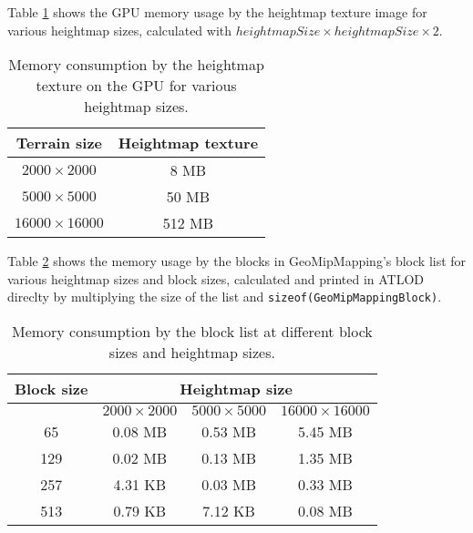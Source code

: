 Table \ref{tbl:memory-heightmap} shows the GPU memory usage by the heightmap texture image 
for various heightmap sizes, calculated with $heightmapSize \times heightmapSize \times 2$.

\begin{table}[H]
  \begin{center}
    \begin{tabular}{ c|c }
      Terrain size & Heightmap texture \\
      \hline
      $2000 \times 2000$ & 8 MB\\
      \hline
      $5000 \times 5000$ & 50 MB\\
      \hline
      $16000 \times 16000$ & 512 MB
    \end{tabular}
  \end{center}
  \caption{Memory consumption by the heightmap texture on the GPU for various heightmap sizes.}\label{tbl:memory-heightmap}
\end{table}

Table \ref{tbl:memory-blocks} shows the memory usage by the blocks in GeoMipMapping's block list for 
various heightmap sizes and block sizes,
calculated and printed in ATLOD direclty by multiplying the size of the list and \texttt{sizeof(GeoMipMappingBlock)}.

\begin{table}[H]
  \begin{center}
    \begin{tabular}{ c|c|c|c }
      Block size & \multicolumn{3}{|c}{Heightmap size}  \\
      \hline
      & $2000 \times 2000$ & $5000 \times 5000$ & $16000 \times 16000$\\
      \hline
      65 & 0.08 MB & 0.53 MB & 5.45 MB\\
      \hline
      129 & 0.02 MB & 0.13 MB & 1.35 MB\\
      \hline
      257 & 4.31 KB & 0.03 MB & 0.33 MB\\
      \hline
      513 & 0.79 KB & 7.12 KB & 0.08 MB\\
    \end{tabular}
  \end{center}
  \caption{Memory consumption by the block list at different block sizes and heightmap sizes.}\label{tbl:memory-blocks}
\end{table}
